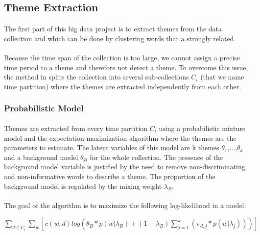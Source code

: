 \subsection{Theme Extraction}
\label{sec:themeExtraction}

\paragraph{}
The first part of this big data project is to extract themes from the data collection and which can be done by clustering words that a strongly related.

\paragraph{}
Because the time span of the collection is too large, we cannot assign a precise time period to a theme and therefore not detect a theme. To overcome this issue, the method in \cite{kdd05-ttm} splits the collection into several sub-collections $C_{i}$ (that we name time partition) where the themes are extracted independently from each other.

\subsubsection{Probabilistic Model}

\paragraph{}
Themes are extracted from every time partition $C_{i}$ using a probabilistic mixture model and the expectation-maximization algorithm where the themes are the parameters to estimate. The latent variables of this model are k themes  $\theta_{1}$,...,$\theta_{k}$ and a background model $\theta_{B}$ for the whole collection. The presence of the background model variable is justified by the need to remove non-discriminating and non-informative words to describe a theme. The proportion of the background model is regulated by the mixing weight $\lambda_{B}$.

\paragraph{}
The goal of the algorithm is to maximize the following log-likelihood in a model:

\begin{center}

$
\sum_{d\in C_{i}} \sum_{w} [c(w,d)log(\theta_{B}*p(w|\lambda_{B}) + (1-\lambda_{B})\sum_{j=1}^{k} (\pi_{d,j}*p(w|\lambda_{j})))] 
$

\end{center}

